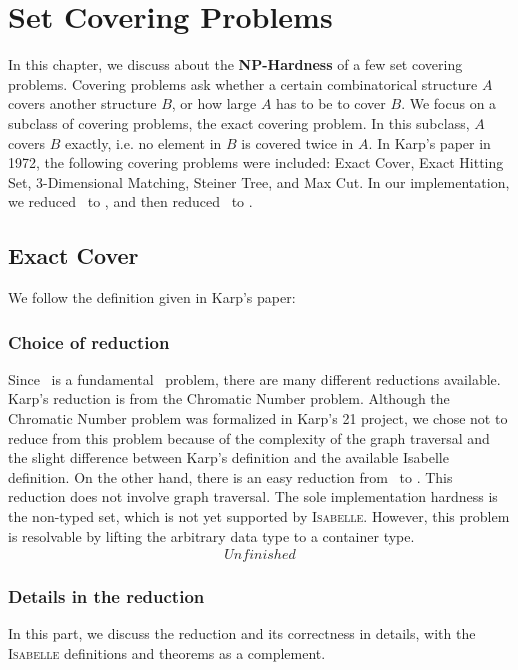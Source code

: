 \chapter{Set Covering Problems}\label{chapter:covering}
In this chapter, we discuss about the \textbf{NP-Hardness} of a few set covering problems. Covering problems ask whether a certain combinatorical structure $A$ covers another structure $B$, or how large $A$ has to be to cover $B$. We focus on a subclass of covering problems, the exact covering problem. In this subclass, $A$ covers $B$ exactly, i.e. no element in $B$ is covered twice in $A$. In Karp's paper in 1972, the following covering problems were included: Exact Cover, Exact Hitting Set, 3-Dimensional Matching, Steiner Tree, and Max Cut. In our implementation, we reduced \SAT\ to \XC, and then reduced \XC\ to \HS. 

\section{Exact Cover}
We follow the definition given in Karp's paper:

\subsection{Choice of reduction}
Since \XC\ is a fundamental \NPH\ problem, there are many different reductions available. Karp's reduction is from the Chromatic Number problem. Although the Chromatic Number problem was formalized in Karp's 21 project, we chose not to reduce from this problem because of the complexity of the graph traversal and the slight difference between Karp's definition and the available Isabelle definition. On the other hand, there is an easy reduction from \SAT\ to \XC. This reduction does not involve graph traversal. The sole implementation hardness is the non-typed set, which is not yet supported by \textsc{Isabelle}. However, this problem is resolvable by lifting the arbitrary data type to a container type. 
\begin{align}
    Unfinished
\end{align}

\subsection{Details in the reduction}
In this part, we discuss the reduction and its correctness in details, with the \textsc{Isabelle} definitions and theorems as a complement.
